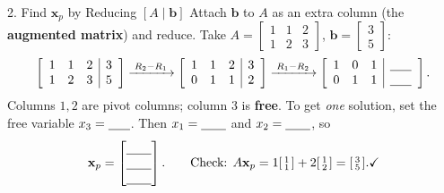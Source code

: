 \documentclass[10pt]{article}
\newcommand{\xx}{\mathbf{x}}
\newcommand{\bb}{\mathbf{b}}
\begin{document}
\begin{notesbox}{2. Find $\xx_p$ by Reducing $[A\mid\bb]$}
Attach $\bb$ to $A$ as an extra column (the \textbf{augmented matrix}) and reduce. Take
$A=\begin{bmatrix} 1 & 1 & 2 \\ 1 & 2 & 3 \end{bmatrix}$, $\bb=\begin{bmatrix} 3 \\ 5 \end{bmatrix}$:
\[
  \left[\begin{array}{ccc|c} 1 & 1 & 2 & 3 \\ 1 & 2 & 3 & 5 \end{array}\right]
  \xrightarrow{\;R_2-R_1\;}
  \left[\begin{array}{ccc|c} 1 & 1 & 2 & 3 \\ 0 & 1 & 1 & 2 \end{array}\right]
  \xrightarrow{\;R_1-R_2\;}
  \left[\begin{array}{ccc|c} 1 & 0 & 1 & \blank{0.6cm} \\ 0 & 1 & 1 & \blank{0.6cm} \end{array}\right].
\]
Columns $1,2$ are pivot columns; column $3$ is \textbf{free}. To get \emph{one} solution, set the free
variable $x_3=\blank{0.6cm}$. Then $x_1=\blank{0.7cm}$ and $x_2=\blank{0.7cm}$, so
\[
  \xx_p=\begin{bmatrix} \rule{0pt}{1.0em}\blank{0.7cm} \\ \blank{0.7cm} \\ \blank{0.7cm} \end{bmatrix}.
  \qquad\text{Check: } A\xx_p=1\begin{bsmallmatrix} 1\\1 \end{bsmallmatrix}+2\begin{bsmallmatrix} 1\\2 \end{bsmallmatrix}=\begin{bsmallmatrix} 3\\5 \end{bsmallmatrix}.\checkmark
\]
\end{notesbox}
\end{document}
